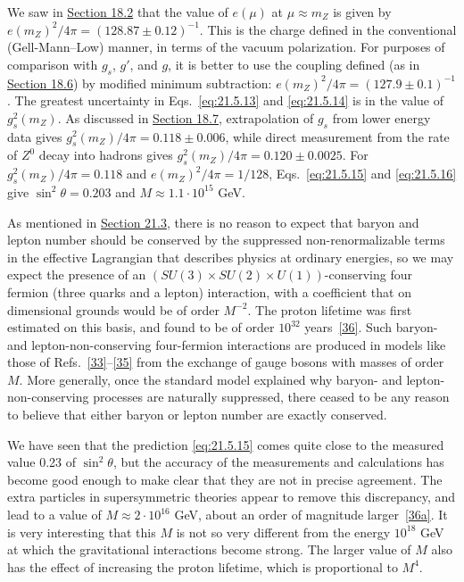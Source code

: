 We saw in \hyperref[sec:18.2]{Section 18.2} that the value of $e(\mu)$ at $\mu\approx m_Z$ is given by $e(m_Z)^2/4\pi=(128.87\pm0.12)^{-1}$. This is the charge defined in the conventional (Gell-Mann--Low) manner, in terms of the vacuum polarization. For purposes of comparison with $g_s$, $g'$, and $g$, it is better to use the coupling defined (as in \hyperref[sec:18.6]{Section 18.6}) by modified minimum subtraction: $e(m_Z)^2/4\pi=(127.9\pm0.1)^{-1}$. The greatest uncertainty in Eqs.~\eqref{eq:21.5.13} and \eqref{eq:21.5.14} is in the value of $g_s^2(m_Z)$. As discussed in \hyperref[sec:18.7]{Section 18.7}, extrapolation of $g_s$ from lower energy data gives $g_s^2(m_Z)/4\pi=0.118\pm0.006$, while direct measurement from the rate of $Z^0$ decay into hadrons gives $g_s^2(m_Z)/4\pi=0.120\pm0.0025$. For $g_s^2(m_Z)/4\pi=0.118$ and $e(m_Z)^2/4\pi=1/128$, Eqs.~\eqref{eq:21.5.15} and \eqref{eq:21.5.16} give $\sin^2\theta=0.203$ and $M\approx1.1\cdot10^{15}$ GeV.

As mentioned in \hyperref[sec:21.3]{Section 21.3}, there is no reason to expect that baryon and lepton number should be conserved by the suppressed non-renormalizable terms in the effective Lagrangian that describes physics at ordinary energies, so we may expect the presence of an $(SU(3)\times SU(2)\times U(1))$-conserving four fermion (three quarks and a lepton) interaction, with a coefficient that on dimensional grounds would be of order $M^{-2}$. The proton lifetime was first estimated on this basis, and found to be of order $10^{32}$ years~\hyperref[ch21-ref-36]{[36]}. Such baryon- and lepton-non-conserving four-fermion interactions are produced in models like those of Refs.~\hyperref[ch21-ref-33]{[33]}--\hyperref[ch21-ref-35]{[35]} from the exchange of gauge bosons with masses of order $M$. More generally, once the standard model explained why baryon- and lepton-non-conserving processes are naturally suppressed, there ceased to be any reason to believe that either baryon or lepton number are exactly conserved.

We have seen that the prediction \eqref{eq:21.5.15} comes quite close to the measured value 0.23 of $\sin^2\theta$, but the accuracy of the measurements and calculations has become good enough to make clear that they are not in precise agreement. The extra particles in supersymmetric theories appear to remove this discrepancy, and lead to a value of $M\approx2\cdot10^{16}$ GeV, about an order of magnitude larger~\hyperref[ch21-ref-36a]{[36a]}. It is very interesting that this $M$ is not so very different from the energy $10^{18}$ GeV at which the gravitational interactions become strong. The larger value of $M$ also has the effect of increasing the proton lifetime, which is proportional to $M^4$.
